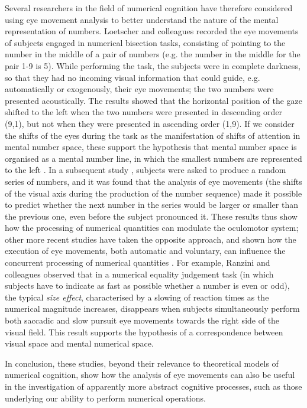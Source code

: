 \documentclass[11pt]{article}
\begin{document}
Several researchers in the field of numerical cognition have therefore considered using eye movement analysis to better understand the nature of the mental representation of numbers. Loetscher and colleagues \cite{Loetscher2008} recorded the eye movements of subjects engaged in numerical bisection tasks, consisting of pointing to the number in the middle of a pair of numbers (e.g. the number in the middle for the pair 1-9 is 5). While performing the task, the subjects were in complete darkness, so that they had no incoming visual information that could guide, e.g. automatically or exogenously, their eye movements; the two numbers were presented acoustically. The results showed that the horizontal position of the gaze shifted to the left when the two numbers were presented in descending order (9,1), but not when they were presented in ascending order (1,9). If we consider the shifts of the eyes during the task as the manifestation of shifts of attention in mental number space, these support the hypothesis that mental number space is organised as a mental number line, in which the smallest numbers are represented to the left \cite{Zorzi2002}. In a subsequent study \cite{Loetscher2010}, subjects were asked to produce a random series of numbers, and it was found that the analysis of eye movements (the shifts of the visual axis during the production of the number sequence) made it possible to predict whether the next number in the series would be larger or smaller than the previous one, even before the subject pronounced it. These results thus show how the processing of numerical quantities can modulate the oculomotor system; other more recent studies have taken the opposite approach, and shown how the execution of eye movements, both automatic and voluntary, can influence the concurrent processing of numerical quantities \cite{Ranzini2015,Ranzini2016}. For example, Ranzini and colleagues observed that in a numerical equality judgement task (in which subjects have to indicate as fast as possible whether a number is even or odd), the typical \textit{size effect}, characterised by a slowing of reaction times as the numerical magnitude increases, disappears when subjects simultaneously perform both saccadic and slow pursuit eye movements towards the right side of the visual field. This result supports the hypothesis of a correspondence between visual space and mental numerical space.

In conclusion, these studies, beyond their relevance to theoretical models of numerical cognition, show how the analysis of eye movements can also be useful in the investigation of apparently more abstract cognitive processes, such as those underlying our ability to perform numerical operations.
\end{document}
